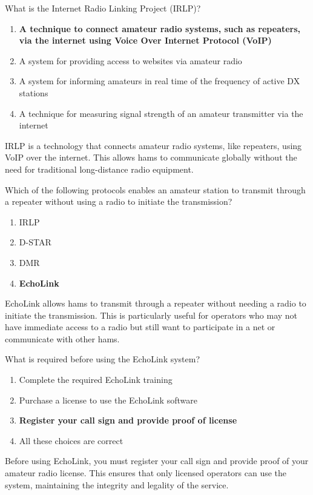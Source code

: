 \begin{tcolorbox}[colback=gray!10!white,colframe=black!75!black,title={T8C08}]
    What is the Internet Radio Linking Project (IRLP)?
    \begin{enumerate}[label=\Alph*),noitemsep]
        \item \textbf{A technique to connect amateur radio systems, such as repeaters, via the internet using Voice Over Internet Protocol (VoIP)}
        \item A system for providing access to websites via amateur radio
        \item A system for informing amateurs in real time of the frequency of active DX stations
        \item A technique for measuring signal strength of an amateur transmitter via the internet
    \end{enumerate}
\end{tcolorbox}
IRLP is a technology that connects amateur radio systems, like repeaters, using VoIP over the internet. This allows hams to communicate globally without the need for traditional long-distance radio equipment.

\begin{tcolorbox}[colback=gray!10!white,colframe=black!75!black,title={T8C09}]
    Which of the following protocols enables an amateur station to transmit through a repeater without using a radio to initiate the transmission?
    \begin{enumerate}[label=\Alph*),noitemsep]
        \item IRLP
        \item D-STAR
        \item DMR
        \item \textbf{EchoLink}
    \end{enumerate}
\end{tcolorbox}
EchoLink allows hams to transmit through a repeater without needing a radio to initiate the transmission. This is particularly useful for operators who may not have immediate access to a radio but still want to participate in a net or communicate with other hams.

\begin{tcolorbox}[colback=gray!10!white,colframe=black!75!black,title={T8C10}]
    What is required before using the EchoLink system?
    \begin{enumerate}[label=\Alph*),noitemsep]
        \item Complete the required EchoLink training
        \item Purchase a license to use the EchoLink software
        \item \textbf{Register your call sign and provide proof of license}
        \item All these choices are correct
    \end{enumerate}
\end{tcolorbox}
Before using EchoLink, you must register your call sign and provide proof of your amateur radio license. This ensures that only licensed operators can use the system, maintaining the integrity and legality of the service.
